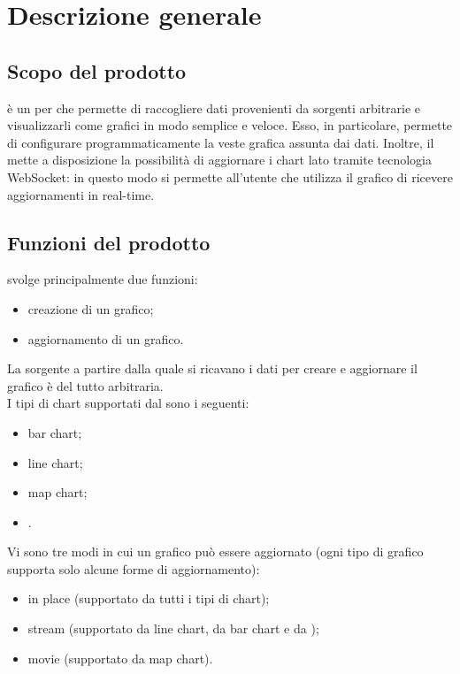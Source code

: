 \section{Descrizione generale}
	\subsection{Scopo del prodotto}
		 è un  per  che permette di raccogliere dati provenienti da sorgenti arbitrarie e visualizzarli come grafici in modo semplice e veloce. Esso, in particolare, permette di configurare programmaticamente la veste grafica assunta dai dati. Inoltre, il  mette a disposizione la possibilità di aggiornare i chart lato  tramite tecnologia WebSocket: in questo modo si permette all'utente che utilizza il grafico di ricevere aggiornamenti in real-time.
	\subsection{Funzioni del prodotto}
		 svolge principalmente due funzioni:
		\begin{itemize}
			\item creazione di un grafico;
			\item aggiornamento di un grafico.
		\end{itemize}
		La sorgente a partire dalla quale si ricavano i dati per creare e aggiornare il grafico è del tutto arbitraria.\\
		I tipi di chart supportati dal  sono i seguenti:
		\begin{itemize}
			\item bar chart;
			\item line chart;
			\item map chart;
			\item {}.
		\end{itemize}
		Vi sono tre modi in cui un grafico può essere aggiornato (ogni tipo di grafico supporta solo alcune forme di aggiornamento):
		\begin{itemize}
			\item in place (supportato da tutti i tipi di chart);
			\item stream (supportato da line chart, da bar chart e da );
			\item movie (supportato da map chart).
		\end{itemize}
